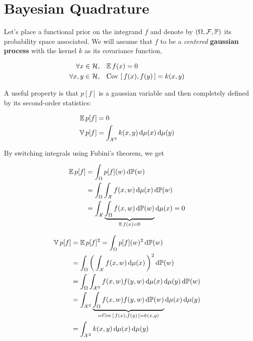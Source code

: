 
\section{Bayesian Quadrature}
\label{sec:BQ}
Let's place a functional prior on the integrand $f$ and denote by $(\Omega, \mathcal{F}, \P)$ its probability space associated. We will assume that $f$ to be
 a \textit{centered} \textbf{gaussian process} with the kernel $k$ as its covariance
 function, \ie
 \begin{boxexample}
   \begin{align*}
     \forall x \in \H, \quad  &\Expec{f(x)} = 0\\
     \forall x, y \in \H, \quad  &\Cov{f(x)}{f(y)} = k(x,y)
   \end{align*}
 \end{boxexample}
A useful property is that $p[f]$ is a gaussian variable and then completely defined by its second-order statistics:
\begin{boxtheorem}
  \begin{align}
    \Expec{p[f]} &= 0\\
    \Var{p[f]} &= \int_{\X^2} k(x,y) \d \mu(x) \d \mu(y)
  \end{align}
\end{boxtheorem}


  By switching integrals using Fubini's theorem, we get
  \begin{boxitemize}
    \begin{align*}
      \Expec{p[f]} &= \int_{\Omega} p[f](w) \d \P(w)\\
      &= \int_{\Omega} \int_{\X} f(x,w) \d \mu(x)  \d \P(w)\\
      &= \int_{\X} \underbrace{\int_{\Omega}  f(x,w) \d \P(w)}_{\Expec{f(x)}=0} \d \mu(x)  =0
    \end{align*}
\end{boxitemize}
\begin{boxitemize}
  \begin{align*}
      \Var{p[f]} &= \Expec{p[f]^2} = \int_{\Omega} p[f](w)^2 \d \P(w)\\
      &=\int_{\Omega} \prt{\int_{\X} f(x,w) \d \mu(x)}^2 \d \P(w)\\
      &=\int_{\Omega} \int_{\X^2} f(x,w)f(y,w) \d \mu(x) \d \mu(y) \d \P(w)\\
      &= \int_{\X^2} \underbrace{\int_{\Omega}  f(x,w)f(y,w) \d \P(w)}_{=\Cov{f(x)}{f(y)} = k(x,y)} \d \mu(x) \d \mu(y) \\
      &= \int_{\X^2}  k(x,y) \d \mu(x) \d \mu(y)
    \end{align*}
\end{boxitemize}

